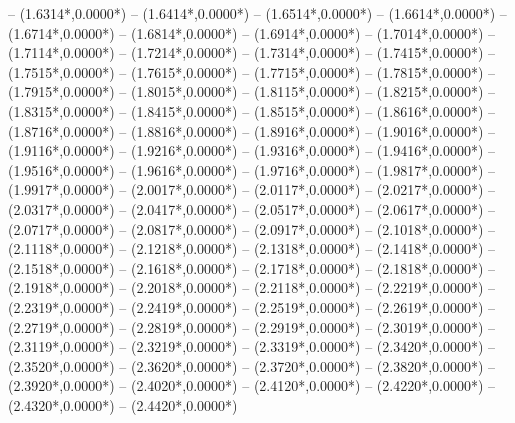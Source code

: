 {	-- ({1.6314*\dx},{0.0000*\dy})
	-- ({1.6414*\dx},{0.0000*\dy})
	-- ({1.6514*\dx},{0.0000*\dy})
	-- ({1.6614*\dx},{0.0000*\dy})
	-- ({1.6714*\dx},{0.0000*\dy})
	-- ({1.6814*\dx},{0.0000*\dy})
	-- ({1.6914*\dx},{0.0000*\dy})
	-- ({1.7014*\dx},{0.0000*\dy})
	-- ({1.7114*\dx},{0.0000*\dy})
	-- ({1.7214*\dx},{0.0000*\dy})
	-- ({1.7314*\dx},{0.0000*\dy})
	-- ({1.7415*\dx},{0.0000*\dy})
	-- ({1.7515*\dx},{0.0000*\dy})
	-- ({1.7615*\dx},{0.0000*\dy})
	-- ({1.7715*\dx},{0.0000*\dy})
	-- ({1.7815*\dx},{0.0000*\dy})
	-- ({1.7915*\dx},{0.0000*\dy})
	-- ({1.8015*\dx},{0.0000*\dy})
	-- ({1.8115*\dx},{0.0000*\dy})
	-- ({1.8215*\dx},{0.0000*\dy})
	-- ({1.8315*\dx},{0.0000*\dy})
	-- ({1.8415*\dx},{0.0000*\dy})
	-- ({1.8515*\dx},{0.0000*\dy})
	-- ({1.8616*\dx},{0.0000*\dy})
	-- ({1.8716*\dx},{0.0000*\dy})
	-- ({1.8816*\dx},{0.0000*\dy})
	-- ({1.8916*\dx},{0.0000*\dy})
	-- ({1.9016*\dx},{0.0000*\dy})
	-- ({1.9116*\dx},{0.0000*\dy})
	-- ({1.9216*\dx},{0.0000*\dy})
	-- ({1.9316*\dx},{0.0000*\dy})
	-- ({1.9416*\dx},{0.0000*\dy})
	-- ({1.9516*\dx},{0.0000*\dy})
	-- ({1.9616*\dx},{0.0000*\dy})
	-- ({1.9716*\dx},{0.0000*\dy})
	-- ({1.9817*\dx},{0.0000*\dy})
	-- ({1.9917*\dx},{0.0000*\dy})
	-- ({2.0017*\dx},{0.0000*\dy})
	-- ({2.0117*\dx},{0.0000*\dy})
	-- ({2.0217*\dx},{0.0000*\dy})
	-- ({2.0317*\dx},{0.0000*\dy})
	-- ({2.0417*\dx},{0.0000*\dy})
	-- ({2.0517*\dx},{0.0000*\dy})
	-- ({2.0617*\dx},{0.0000*\dy})
	-- ({2.0717*\dx},{0.0000*\dy})
	-- ({2.0817*\dx},{0.0000*\dy})
	-- ({2.0917*\dx},{0.0000*\dy})
	-- ({2.1018*\dx},{0.0000*\dy})
	-- ({2.1118*\dx},{0.0000*\dy})
	-- ({2.1218*\dx},{0.0000*\dy})
	-- ({2.1318*\dx},{0.0000*\dy})
	-- ({2.1418*\dx},{0.0000*\dy})
	-- ({2.1518*\dx},{0.0000*\dy})
	-- ({2.1618*\dx},{0.0000*\dy})
	-- ({2.1718*\dx},{0.0000*\dy})
	-- ({2.1818*\dx},{0.0000*\dy})
	-- ({2.1918*\dx},{0.0000*\dy})
	-- ({2.2018*\dx},{0.0000*\dy})
	-- ({2.2118*\dx},{0.0000*\dy})
	-- ({2.2219*\dx},{0.0000*\dy})
	-- ({2.2319*\dx},{0.0000*\dy})
	-- ({2.2419*\dx},{0.0000*\dy})
	-- ({2.2519*\dx},{0.0000*\dy})
	-- ({2.2619*\dx},{0.0000*\dy})
	-- ({2.2719*\dx},{0.0000*\dy})
	-- ({2.2819*\dx},{0.0000*\dy})
	-- ({2.2919*\dx},{0.0000*\dy})
	-- ({2.3019*\dx},{0.0000*\dy})
	-- ({2.3119*\dx},{0.0000*\dy})
	-- ({2.3219*\dx},{0.0000*\dy})
	-- ({2.3319*\dx},{0.0000*\dy})
	-- ({2.3420*\dx},{0.0000*\dy})
	-- ({2.3520*\dx},{0.0000*\dy})
	-- ({2.3620*\dx},{0.0000*\dy})
	-- ({2.3720*\dx},{0.0000*\dy})
	-- ({2.3820*\dx},{0.0000*\dy})
	-- ({2.3920*\dx},{0.0000*\dy})
	-- ({2.4020*\dx},{0.0000*\dy})
	-- ({2.4120*\dx},{0.0000*\dy})
	-- ({2.4220*\dx},{0.0000*\dy})
	-- ({2.4320*\dx},{0.0000*\dy})
	-- ({2.4420*\dx},{0.0000*\dy})
}
